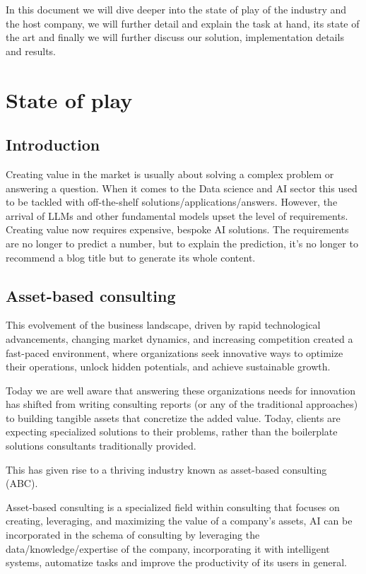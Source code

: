 \documentclass[a4paper,12pt]{article}
\begin{document}
In this document we will dive deeper into the state of play of the industry and the host company, 
we will further detail and explain the task at hand, its state of the art and finally we will further discuss our solution, implementation details and 
results.

\newpage

\section{State of play}
\subsection{Introduction}
Creating value in the market is usually about solving a complex problem or answering a question. When it comes to the Data science and AI sector this used to be tackled with off-the-shelf solutions/applications/answers.
However, the arrival of LLMs and other fundamental models upset the level of requirements. Creating value now requires expensive,  bespoke AI solutions. 
The requirements are no longer to predict a number, but to explain the prediction, it's no longer to recommend a blog title but to generate its whole content.   

\subsection{Asset-based consulting}
This evolvement of the business landscape, driven by rapid technological advancements, changing market dynamics, and increasing competition created a fast-paced environment, where organizations seek innovative ways to optimize their operations, unlock hidden potentials, and achieve sustainable growth. 

Today we are well aware that answering these organizations needs for innovation has shifted from writing consulting reports (or any of the traditional approaches) to building tangible assets that concretize the added value. Today, clients are expecting specialized solutions to their problems, rather than the boilerplate solutions consultants traditionally provided.

This has given rise to a thriving industry known as asset-based consulting (ABC).

Asset-based consulting is a specialized field within consulting that focuses on creating, leveraging, and maximizing the value of a company's assets, 
AI can be incorporated in the schema of consulting by leveraging the data/knowledge/expertise of the company, incorporating it with intelligent systems, 
automatize tasks and improve the productivity of its users in general. 
\end{document}
